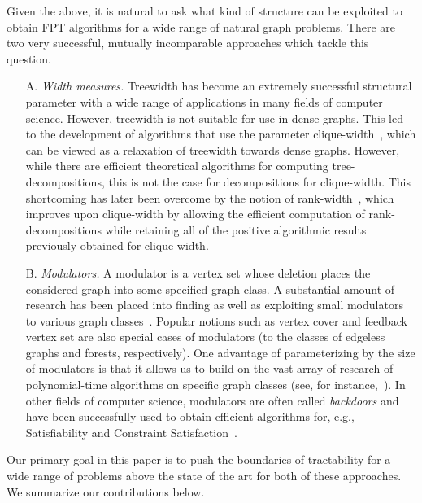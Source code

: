 \documentclass{llncs}
\begin{document}
Given the above, it is natural to ask what kind of structure can be exploited to obtain FPT algorithms for a wide range of natural graph problems. There are two very successful, mutually incomparable approaches which tackle this question.

\begin{enumerate}[leftmargin=*]
\item[A.] \emph{Width measures.} Treewidth has become an extremely successful structural parameter with a wide range of applications in many fields of computer science. However, treewidth is not suitable for use in dense graphs. This led to the development of algorithms that use the parameter clique-width~\cite{CourcelleMakowskyRotics00}, which can be viewed as a relaxation of treewidth towards dense graphs. However, while there are efficient theoretical algorithms for computing tree-decompositions, this is not the case for decompositions for clique-width. This shortcoming has later been overcome by the notion of rank-width~\cite{OumSeymour06}, which improves upon clique-width by allowing the efficient computation of rank-decompositions while retaining all of the positive algorithmic results previously obtained for clique-width.
\item[B.] \sloppypar \emph{Modulators.} A modulator is a vertex set whose deletion places the considered graph into some specified graph class. A substantial amount of research has been placed into finding as well as exploiting small modulators to various graph classes~\cite{GajarskyHlinenyObdrzalek13,BodlaenderJansenKratsch13}. Popular notions such as vertex cover and feedback vertex set are also special cases of modulators (to the classes of edgeless graphs and forests, respectively). One advantage of parameterizing by the size of modulators is that it allows us to build on the vast array of research of polynomial-time algorithms on specific graph classes (see, for instance,~\cite{CorneilLerchsBurlingham81,LokshtanovVatshelleVillanger14}). In other fields of computer science, modulators are often called \emph{backdoors} and have been successfully used to obtain efficient algorithms for, e.g., Satisfiability and Constraint Satisfaction~\cite{GaspersMisraOSZ14}.
\end{enumerate}
Our primary goal in this paper is to push the boundaries of tractability for a wide range of problems above the state of the art for both of these approaches. We summarize our contributions below.\smallskip
\end{document}

